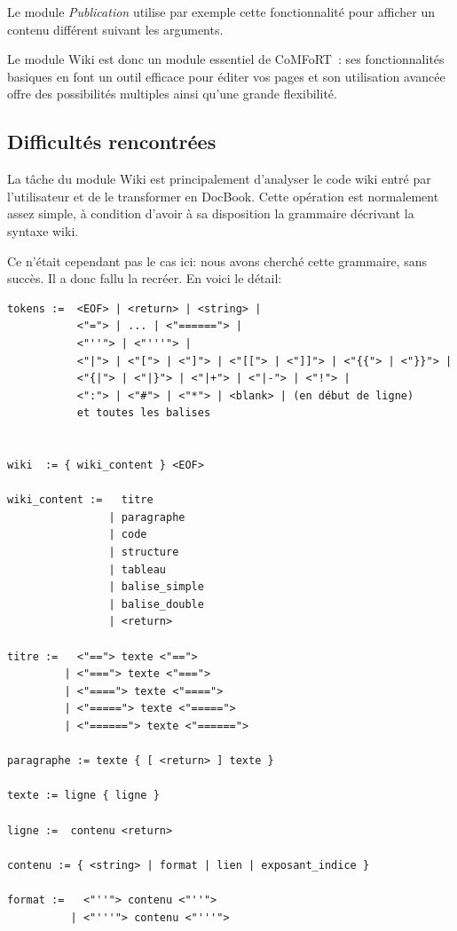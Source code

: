 \documentclass[final,11pt,a4paper,twoside,titlepage]{article}
\newcommand{\p}{\vspace{0.3em}}
\begin{document}
{      Le module \emph{Publication} utilise par exemple cette fonctionnalité pour
      afficher un contenu différent suivant les arguments.\p

      Le module Wiki est donc un module essentiel de CoMFoRT~: ses
      fonctionnalités basiques en font un outil efficace pour éditer vos pages
      et son utilisation avancée offre des possibilités multiples ainsi qu'une
      grande flexibilité.

  \subsection{Difficultés rencontrées}
    La tâche du module Wiki est principalement d'analyser le code wiki entré par
    l'utilisateur et de le transformer en DocBook. Cette opération est
    normalement assez simple, à condition d'avoir à sa disposition la grammaire
    décrivant la syntaxe wiki.\p
    
    Ce n'était cependant pas le cas ici: nous avons cherché cette grammaire, 
    sans succès. Il a donc fallu la recréer. En voici le détail:
    
    \begin{verbatim}  
tokens :=  <EOF> | <return> | <string> |
           <"="> | ... | <"======"> |
           <"''"> | <"'''"> |
           <"|"> | <"["> | <"]"> | <"[["> | <"]]"> | <"{{"> | <"}}"> |
           <"{|"> | <"|}"> | <"|+"> | <"|-"> | <"!"> |
           <":"> | <"#"> | <"*"> | <blank> | (en début de ligne)
           et toutes les balises
           
          
wiki  := { wiki_content } <EOF>

wiki_content :=   titre 
                | paragraphe 
                | code 
                | structure
                | tableau
                | balise_simple 
                | balise_double 
                | <return>
  
titre :=   <"=="> texte <"=="> 
         | <"==="> texte <"===">
         | <"===="> texte <"====">
         | <"====="> texte <"=====">
         | <"======"> texte <"======">
       
paragraphe := texte { [ <return> ] texte }
           
texte := ligne { ligne }
  
ligne :=  contenu <return>
  
contenu := { <string> | format | lien | exposant_indice }
       
format :=   <"''"> contenu <"''">
          | <"'''"> contenu <"'''">
            

\end{verbatim}}
\end{document}
